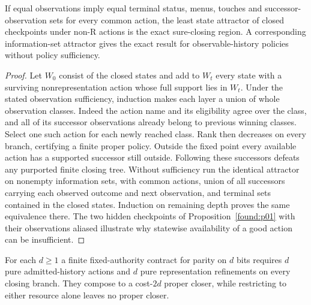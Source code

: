\begin{proposition}\label{found:p05}

If equal observations imply equal terminal status, menus, touches and successor-observation sets for every common action, the least state attractor of closed checkpoints under non-R actions is the exact sure-closing region. A corresponding information-set attractor gives the exact result for observable-history policies without policy sufficiency.

\end{proposition}

\begin{proof}

Let \(W_0\) consist of the closed states and add to \(W_t\) every state with a surviving nonrepresentation action whose full support lies in \(W_t\). Under the stated observation sufficiency, induction makes each layer a union of whole observation classes. Indeed the action name and its eligibility agree over the class, and all of its successor observations already belong to previous winning classes. Select one such action for each newly reached class. Rank then decreases on every branch, certifying a finite proper policy. Outside the fixed point every available action has a supported successor still outside. Following these successors defeats any purported finite closing tree. Without sufficiency run the identical attractor on nonempty information sets, with common actions, union of all successors carrying each observed outcome and next observation, and terminal sets contained in the closed states. Induction on remaining depth proves the same equivalence there. The two hidden checkpoints of Proposition~\ref{found:p01} with their observations aliased illustrate why statewise availability of a good action can be insufficient.

\end{proof}

\begin{proposition}\label{found:p06}

For each \(d\geq 1\) a finite fixed-authority contract for parity on \(d\) bits requires \(d\) pure admitted-history actions and \(d\) pure representation refinements on every closing branch. They compose to a cost-\(2d\) proper closer, while restricting to either resource alone leaves no proper closer.

\end{proposition}

